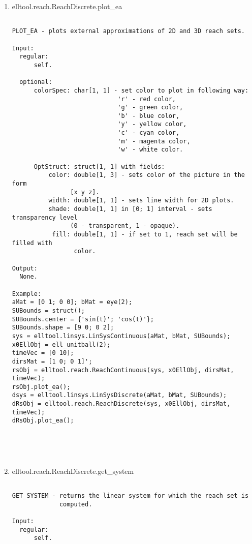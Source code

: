 \begin{enumerate}
\begin{lstlisting}
\end{lstlisting}
\fontfamily{\familydefault}
\selectfont
\item {elltool.reach.ReachDiscrete.plot\_ea}
\selectfont
\begin{lstlisting}

PLOT_EA - plots external approximations of 2D and 3D reach sets.

Input:
  regular:
      self.

  optional:
      colorSpec: char[1, 1] - set color to plot in following way:
                             'r' - red color,
                             'g' - green color,
                             'b' - blue color,
                             'y' - yellow color,
                             'c' - cyan color,
                             'm' - magenta color,
                             'w' - white color.

      OptStruct: struct[1, 1] with fields:
          color: double[1, 3] - sets color of the picture in the form
                [x y z].
          width: double[1, 1] - sets line width for 2D plots.
          shade: double[1, 1] in [0; 1] interval - sets transparency level
                (0 - transparent, 1 - opaque).
           fill: double[1, 1] - if set to 1, reach set will be filled with
                 color.

Output:
  None.

Example:
aMat = [0 1; 0 0]; bMat = eye(2);
SUBounds = struct();
SUBounds.center = {'sin(t)'; 'cos(t)'};
SUBounds.shape = [9 0; 0 2];
sys = elltool.linsys.LinSysContinuous(aMat, bMat, SUBounds);
x0EllObj = ell_unitball(2);
timeVec = [0 10];
dirsMat = [1 0; 0 1]';
rsObj = elltool.reach.ReachContinuous(sys, x0EllObj, dirsMat, timeVec);
rsObj.plot_ea();
dsys = elltool.linsys.LinSysDiscrete(aMat, bMat, SUBounds);
dRsObj = elltool.reach.ReachDiscrete(sys, x0EllObj, dirsMat, timeVec);
dRsObj.plot_ea();





\end{lstlisting}
\fontfamily{\familydefault}
\selectfont
\item {elltool.reach.ReachDiscrete.get\_system}
\selectfont
\begin{lstlisting}

GET_SYSTEM - returns the linear system for which the reach set is
             computed.

Input:
  regular:
      self.


\end{lstlisting}
\end{enumerate}
